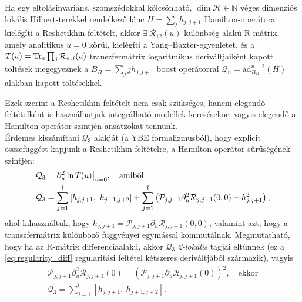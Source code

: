 \documentclass[12pt,a4paper,oneside]{report}
\newcommand{\R}{\mathcal{R}}
\renewcommand{\P}{\mathcal{P}}
\newcommand{\Q}{\mathcal{Q}}
\newcommand{\ad}{\mathrm{ad}}
\newcommand{\N}{\mathbb{N}}
\newcommand{\Hil}{\mathscr{H}}
\begin{document}
\begin{tetel}
    Ha egy eltolásinvariáns, szomszédokkal kölcsönható, $\dim \Hil\in \N$ véges dimenziós lokális Hilbert-terekkel rendelkező lánc $H=\sum_jh_{j,j+1}$ Hamilton-operátora kielégíti a Reshetikhin-feltételt, akkor $\exists\ \R_{12}(u)$ különbség alakú R-mátrix, amely analitikus $u=0$ körül, kielégíti a Yang--Baxter-egyenletet, és a $T(u)=\Tr_a\prod_j\R_{a,j}(u)$ transzfermátrix logaritmikus deriváltjaiként kapott töltések megegyeznek a $B_H=\sum_jjh_{j,j+1}$ boost operátorral $\Q_n=\ad_{B_H}^{n-2}(H)$ alakban kapott töltésekkel.
\end{tetel}
Ezek szerint a Reshetikhin-feltételt nem csak szükséges, hanem elegendő feltételként is használhatjuk integrálható modellek keresésekor, vagyis elegendő a Hamilton-operátor szintjén ansatzokat tennünk.\\

Érdemes kiszámítani $\Q_3$ alakját (a YBE formalizmusból), hogy explicit összefüggést kapjunk a Reshetikhin-feltételre, a Hamilton-operátor sűrűségének szintjén:
\begin{align}
    \Q_3&=\partial^2_u\ln T(u)\big|_{u=0}, \quad \textnormal{amiből} \\
    \Q_3&=\sum_{j=1}^l \left[h_{j,j+1},\ h_{j+1,j+2}\right] + \sum_{j=1}^l\left(\P_{j,j+1}\partial^2_u\R_{j,j+1}(0,0)-h_{j,j+1}^2\right),
\end{align}
ahol kihasználtuk, hogy $h_{j,j+1}=\P_{j,j+1}\partial_u\R_{j,j+1}(0,0)$, valamint azt, hogy a transzfermátrix különböző függvényei egymással kommutálnak. Megmutatható, hogy ha az R-mátrix differenciaalakú, akkor $\Q_3$ \textit{2-lokális} tagjai eltűnnek (ez a \eqref{eq:regularity_diff} regularitási feltétel kétszeres deriváltjából származik), vagyis
\begin{gather}
    \P_{j,j+1}\partial^2_u\R_{j,j+1}(0)=\left(\P_{j,j+1}\partial_u\R_{j,j+1}(0)\right)^2,\quad \text{ekkor} \\
    \Q_3=\sum_{j=1}^l \left[h_{j,j+1},\ h_{j+1,j+2}\right].
\end{gather}
\end{document}
